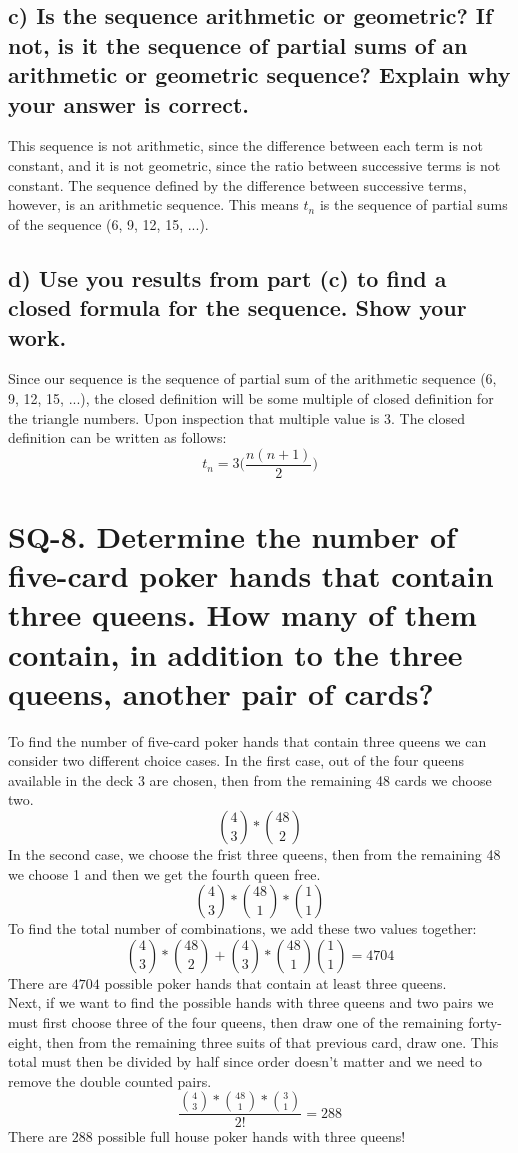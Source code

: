 \documentclass{article}
\begin{document}
\subsection*{c) Is the sequence arithmetic or geometric? If not, is it the sequence of partial sums of an arithmetic or geometric sequence? Explain why your answer is correct.}
This sequence is not arithmetic, since the difference between each term is not constant, and it is not geometric, since the ratio between successive terms is not constant. The sequence defined by the difference between successive terms, however, is an arithmetic sequence. This means $t_n$ is the sequence of partial sums of the sequence (6, 9, 12, 15, ...).
\subsection*{d) Use you results from part (c) to find a closed formula for the sequence. Show your work.}
Since our sequence is the sequence of partial sum of the arithmetic sequence (6, 9, 12, 15, ...), the closed definition will be some multiple of closed definition for the triangle numbers. Upon inspection that multiple value is 3. The closed definition can be written as follows:
$$t_n = 3\Big(\frac{n(n+1)}{2}\Big)$$
\newpage

\section*{SQ-8. Determine the number of five-card poker hands that contain three queens. How many of them contain, in addition to the three queens, another pair of cards?}

To find the number of five-card poker hands that contain three queens we can consider two different choice cases. In the first case, out of the four queens available in the deck 3 are chosen, then from the remaining 48 cards we choose two.
$$\binom{4}{3}*\binom{48}{2}$$
In the second case, we choose the frist three queens, then from the remaining 48 we choose 1 and then we get the fourth queen free.
$$\binom{4}{3}*\binom{48}{1}*\binom{1}{1}$$
To find the total number of combinations, we add these two values together:
$$\binom{4}{3}*\binom{48}{2}+\binom{4}{3}*\binom{48}{1}\binom{1}{1} = 4704$$
There are $4704$ possible poker hands that contain at least three queens.
$$$$
Next, if we want to find the possible hands with three queens and two pairs we must first choose three of the four queens, then draw one of the remaining forty-eight, then from the remaining three suits of that previous card, draw one. This total must then be divided by half since order doesn't matter and we need to remove the double counted pairs.
$$\frac{\binom{4}{3}*\binom{48}{1}*\binom{3}{1}}{2!} = 288$$
There are $288$ possible full house poker hands with three queens!
\end{document}
